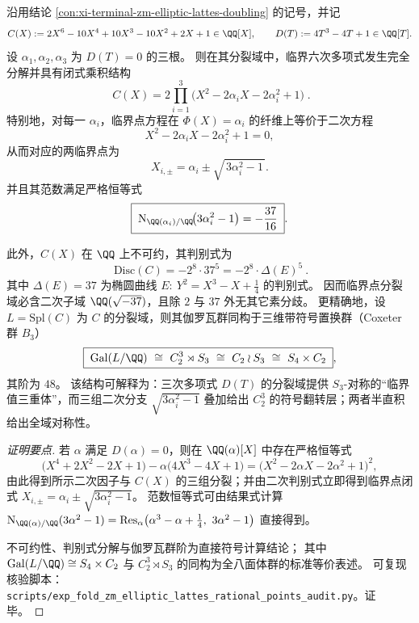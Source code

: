 \begin{conclusion}\label{con:xi-terminal-zm-elliptic-lattes-critical-sextic-galois}
沿用结论 \ref{con:xi-terminal-zm-elliptic-lattes-doubling} 的记号，并记
\[
C(X):=2X^{6}-10X^{4}+10X^{3}-10X^{2}+2X+1\in\QQ[X],
\qquad
D(T):=4T^{3}-4T+1\in\QQ[T].
\]
设 \(\alpha_{1},\alpha_{2},\alpha_{3}\) 为 \(D(T)=0\) 的三根。
则在其分裂域中，临界六次多项式发生完全分解并具有闭式乘积结构
\[
\boxed{\;
C(X)=2\prod_{i=1}^{3}\bigl(X^{2}-2\alpha_{i}X-2\alpha_{i}^{2}+1\bigr)\; }.
\]
特别地，对每一 \(\alpha_i\)，临界点方程在 \(\Phi(X)=\alpha_i\) 的纤维上等价于二次方程
\[
X^{2}-2\alpha_{i}X-2\alpha_{i}^{2}+1=0,
\]
从而对应的两临界点为
\[
X_{i,\pm}=\alpha_{i}\pm\sqrt{\,3\alpha_{i}^{2}-1\,}.
\]
并且其范数满足严格恒等式
\[
\boxed{\;
\operatorname{N}_{\QQ(\alpha_{i})/\QQ}\!\bigl(3\alpha_{i}^{2}-1\bigr)=-\frac{37}{16}\; }.
\]
\par
此外，\(C(X)\) 在 \(\QQ\) 上不可约，其判别式为
\[
\boxed{\ \mathrm{Disc}(C)=-2^{8}\cdot 37^{5}=-2^{8}\cdot \Delta(E)^{5}\ }.
\]
其中 \(\Delta(E)=37\) 为椭圆曲线 \(E:\ Y^2=X^3-X+\tfrac14\) 的判别式。
因而临界点分裂域必含二次子域 \(\QQ(\sqrt{-37})\)，且除 \(2\) 与 \(37\) 外无其它素分歧。
更精确地，设 \(L=\mathrm{Spl}(C)\) 为 \(C\) 的分裂域，则其伽罗瓦群同构于三维带符号置换群（Coxeter 群 \(B_{3}\)）
\[
\boxed{\;
\mathrm{Gal}(L/\QQ)\ \cong\ C_{2}^{3}\rtimes S_{3}\ \cong\ C_{2}\wr S_{3}\ \cong\ S_{4}\times C_{2}\; } ,
\]
其阶为 \(48\)。
该结构可解释为：三次多项式 \(D(T)\) 的分裂域提供 \(S_{3}\)-对称的“临界值三重体”，而三组二次分支 \(\sqrt{3\alpha_{i}^{2}-1}\) 叠加给出 \(C_{2}^{3}\) 的符号翻转层；两者半直积给出全域对称性。
\end{conclusion}
\begin{proof}[证明要点]
若 \(\alpha\) 满足 \(D(\alpha)=0\)，则在 \(\QQ(\alpha)[X]\) 中存在严格恒等式
\[
\bigl(X^{4}+2X^{2}-2X+1\bigr)-\alpha\bigl(4X^{3}-4X+1\bigr)=\bigl(X^{2}-2\alpha X-2\alpha^{2}+1\bigr)^{2},
\]
由此得到所示二次因子与 \(C(X)\) 的三组分裂；并由二次判别式立即得到临界点闭式
\(
X_{i,\pm}=\alpha_i\pm\sqrt{3\alpha_i^{2}-1}
\)。
范数恒等式可由结果式计算
\(
\operatorname{N}_{\QQ(\alpha)/\QQ}(3\alpha^{2}-1)=\mathrm{Res}_{\alpha}\bigl(\alpha^{3}-\alpha+\tfrac14,\ 3\alpha^{2}-1\bigr)
\)
直接得到。
\par
不可约性、判别式分解与伽罗瓦群阶为直接符号计算结论；
其中 \(\mathrm{Gal}(L/\QQ)\cong S_{4}\times C_{2}\) 与 \(C_{2}^{3}\rtimes S_{3}\) 的同构为全八面体群的标准等价表述。
可复现核验脚本：\texttt{scripts/exp\_fold\_zm\_elliptic\_lattes\_rational\_points\_audit.py}。证毕。
\end{proof}

